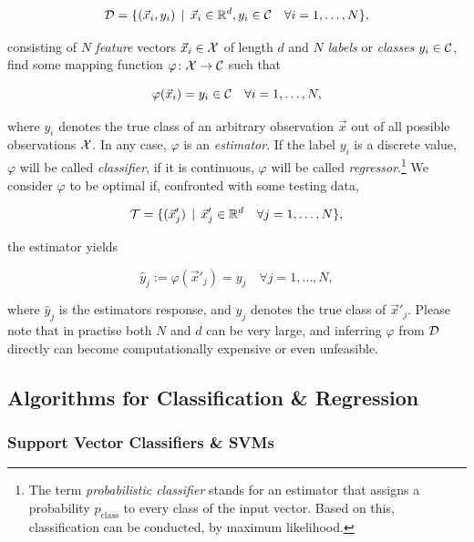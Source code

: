 \begin{equation}
\mathcal{D} = \{ (\vec x_i, y_i) \, \mid \, \vec x_i \in \mathbb{R}^d, y_i \in \mathcal{C} \quad \forall i = 1,\ldots,N \},
\end{equation}

consisting of $N$ \emph{feature} vectors $\vec x_i \in \mathcal{X}$ of length $d$ and $N$ \emph{labels} or \emph{classes} $y_i \in \mathcal{C}$, find some mapping function $\varphi \colon \mathcal{X} \to \mathcal{C}$ such that

\begin{equation}
\varphi(\vec x_i) = y_i \in \mathcal{C} \quad \forall i = 1,\ldots,N,
\end{equation}

where $y_i$ denotes the true class of an arbitrary observation $\vec x$ out of all possible observations $\mathcal{X}$. In any case, $\varphi$ is an \emph{estimator}. If the label $y_i$ is a discrete value, $\varphi$ will be called \emph{classifier}, if it is continuous, $\varphi$ will be called \emph{regressor}.\footnote{The term \emph{probabilistic classifier} stands for an estimator that assigns a probability $p_{\text{class}}$ to every class of the input vector. Based on this, classification can be conducted, \eg by maximum likelihood.} We consider $\varphi$ to be optimal if, confronted with some testing data,

\begin{equation}
\mathcal{T} = \{ (\vec x'_j) \, \mid \, \vec x'_j \in \mathbb{R}^d \quad \forall j = 1,\ldots,N \},
\end{equation}

the estimator yields

\begin{equation}
\hat y_j := \varphi({\vec x'_j}) = y_j \quad \forall j = 1,\ldots,N,
\end{equation}

where $\hat y_j$ is the estimators response, and $y_j$ denotes the true class of $\vec x'_j$. Please note that in practise both $N$ and $d$ can be very large, and inferring $\varphi$ from $\mathcal{D}$ directly can become computationally expensive or even unfeasible.

\subsection{Algorithms for Classification \& Regression}
\label{subsec:algorithms-classification-and-regression}
\subsubsection{Support Vector Classifiers \& SVMs}

